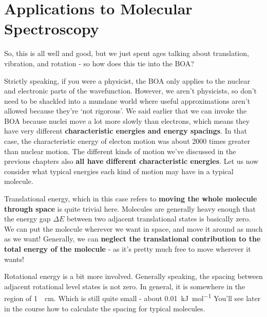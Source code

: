 \documentclass{memoir}[11pt,oneside,a4paper,openany]
\begin{document}
\section{Applications to Molecular Spectroscopy}
So, this is all well and good, but we just spent ages talking about translation, vibration, and rotation - so how does this tie into the BOA?

Strictly speaking, if you were a physicist, the BOA only applies to the nuclear and electronic parts of the wavefunction. However, we aren't physicists, so don't need to be shackled into a mundane world where useful approximations aren't allowed because they're `not rigorous'. We said earlier that we can invoke the BOA because nuclei move a lot more slowly than electrons, which means they have very different \textbf{characteristic energies and energy spacings}. In that case, the characteristic energy of electon motion was about 2000 times greater than nuclear motion. The different kinds of motion we've discussed in the previous chapters also \textbf{all have different characteristic energies}. Let us now consider what typical energies each kind of motion may have in a typical molecule. 

Translational energy, which in this case refers to \textbf{moving the whole molecule through space} is quite trivial here. Molecules are generally heavy enough that the energy gap $\Delta E$ between two adjacent translational states is basically zero. We can put the molecule wherever we want in space, and move it around as much as we want! Generally, we can \textbf{neglect the translational contribution to the total energy of the molecule} - as it's pretty much free to move wherever it wants!

Rotational energy is a bit more involved. Generally speaking, the spacing between adjacent rotational level states is not zero. In general, it is somewhere in the region of \SI{1}{\per\centi\metre}. Which is still quite small - about \SI{0.01}{\kilo\joule\per\mole} You'll see later in the course how to calculate the spacing for typical molecules. 
\end{document}
